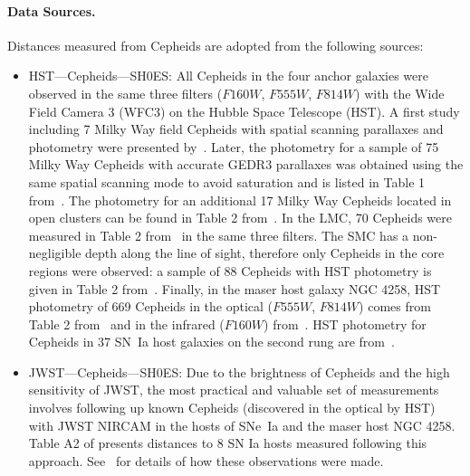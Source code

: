 \paragraph{Data Sources.}
Distances measured from Cepheids are adopted from the following sources:
\begin{itemize}
\item HST---Cepheids---SH0ES: All Cepheids in the four anchor galaxies were observed in the same three filters ($F160W$, $F555W$, $F814W$) with the Wide Field Camera 3 (WFC3) on the Hubble Space Telescope (HST). A first study including 7 Milky Way field Cepheids with spatial scanning parallaxes and photometry were presented by~\citet{2018ApJ...855..136R}. Later, the photometry for a sample of 75 Milky Way Cepheids with accurate GEDR3 parallaxes was obtained using the same spatial scanning mode to avoid saturation and is listed in Table 1 from~\citet{2021ApJ...908L...6R}.  The photometry for an additional 17 Milky Way Cepheids located in open clusters can be found in Table 2 from~\citet{2022ApJ...938...36R}. In the LMC, 70 Cepheids were measured in Table 2 from~\citet{2019ApJ...876...85R} in the same three filters. The SMC has a non-negligible depth along the line of sight, therefore only Cepheids in the core regions were observed: a sample of 88 Cepheids with HST photometry is given in Table 2 from~\citet{2024ApJ...973...30B}. Finally, in the maser host galaxy NGC 4258, HST photometry of 669 Cepheids in the optical ($F555W$, $F814W$) comes from Table 2 from~\citet{2022ApJ...940...64Y} and in the infrared ($F160W$) from~\citet{2022ApJ...934L...7R}. HST photometry for Cepheids in 37 SN~Ia host galaxies on the second rung are from~\citet{2022ApJ...934L...7R}.
\item JWST---Cepheids---SH0ES: Due to the brightness of Cepheids and the high sensitivity of JWST, the most practical and valuable set of measurements involves following up known Cepheids (discovered in the optical by HST) with JWST NIRCAM in the hosts of SNe~Ia and the maser host NGC 4258. Table A2 of \citet{2024ApJ...977..120R} presents distances to 8 SN Ia hosts measured following this approach.  See~\citet{2023ApJ...956L..18R} for details of how these observations were made.
\end{itemize}

